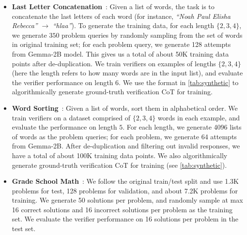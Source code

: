 \begin{itemize}
    \item \textbf{Last Letter Concatenation}~\citep{wei2022chain}: Given a list of words, the task is to concatenate the last letters of each word (for instance, \textit{``Noah Paul Elisha Rebecca''} $\rightarrow$ \textit{``hlaa''}). To generate the training data, for each length $\{2, 3, 4\}$, we generate $350$ problem queries by randomly sampling from the set of words in original training set; for each problem query, we generate 128 attempts from Gemma-2B \citep{gemma} model. This gives us a total of about 50K training data points after de-duplication. We train verifiers on examples of lengths $\{2, 3, 4\}$ (here the length refers to how many words are in the input list), and evaluate the verifier performance on length 6. We use the format in \autoref{tab:synthetic} to algorithmically generate ground-truth verification CoT for training.
    \item \textbf{Word Sorting}~\citep{suzgun2022challenging}: Given a list of words, sort them in alphabetical order. We train verifiers on a dataset comprised of $\{2, 3, 4\}$ words in each example, and evaluate the performance on length $5$. For each length, we generate 4096 lists of words as the problem queries; for each problem, we generate 64 attempts from Gemma-2B. After de-duplication and filtering out invalid responses, we have a total of about 100K training data points. We also algorithmically generate ground-truth verification CoT for training (see \autoref{tab:synthetic}).
    \item \textbf{Grade School Math}~\citep{cobbe2021training}: We follow the original train/test split and use 1.3K problems for test, 128 problems for validation, and about 7.2K problems for training. We generate 50 solutions per problem, and randomly sample at max 16 correct solutions and 16 incorrect solutions per problem as the training set. We evaluate the verifier performance on 16 solutions per problem in the test set.
\end{itemize}


